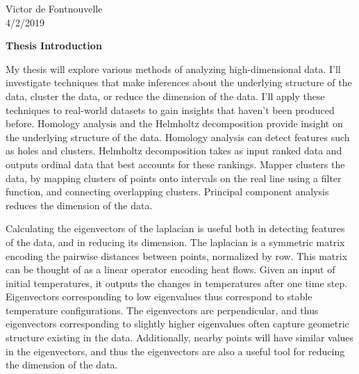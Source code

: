 \documentclass{article}
\begin{document}
\noindent Victor de Fontnouvelle
\\ 4/2/2019

\begin{center}
\textbf{Thesis Introduction}
\end{center}

My thesis will explore various methods of analyzing high-dimensional data. I'll investigate techniques that make inferences about the underlying structure of the data, cluster the data, or reduce the dimension of the data. I'll apply these techniques to real-world datasets to gain insights that haven't been produced before. Homology analysis and the Helmholtz decomposition provide insight on the underlying structure of the data. Homology analysis can detect features such as holes and clusters. Helmholtz decomposition takes as input ranked data and outputs ordinal data that best accounts for these rankings. Mapper clusters the data, by mapping clusters of points onto intervals on the real line using a filter function, and connecting overlapping clusters. Principal component analysis reduces the dimension of the data.

Calculating the eigenvectors of the laplacian is useful both in detecting features of the data, and in reducing its dimension. The laplacian is a symmetric matrix encoding the pairwise distances between points, normalized by row. This matrix can be thought of as a linear operator encoding heat flows. Given an input of initial temperatures, it outputs the changes in temperatures after one time step. Eigenvectors corresponding to low eigenvalues thus correspond to stable temperature configurations. The eigenvectors are perpendicular, and thus eigenvectors corresponding to slightly higher eigenvalues often capture geometric structure existing in the data. Additionally, nearby points will have similar values in the eigenvectors, and thus the eigenvectors are also a useful tool for reducing the dimension of the data.
\end{document}
